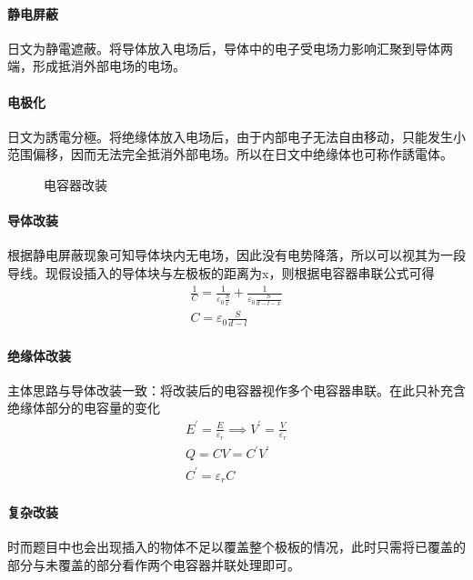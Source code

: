 \paragraph{静电屏蔽}日文为静電遮蔽。将导体放入电场后，导体中的电子受电场力影响汇聚到导体两端，形成抵消外部电场的电场。

\paragraph{电极化}日文为誘電分極。将绝缘体放入电场后，由于内部电子无法自由移动，只能发生小范围偏移，因而无法完全抵消外部电场。所以在日文中绝缘体也可称作誘電体。

\begin{figure}[ht!]
    \centering
    \caption{电容器改装}
\end{figure}

\paragraph{导体改装}根据静电屏蔽现象可知导体块内无电场，因此没有电势降落，所以可以视其为一段导线。现假设插入的导体块与左极板的距离为x，则根据电容器串联公式可得
\begin{gather*}
    \frac{1}{C}=\frac{1}{\varepsilon_0\frac{S}{x}}+\frac{1}{\varepsilon_0\frac{S}{d-l-x}}\\
    C=\varepsilon_0\frac{S}{d-l}
\end{gather*}

\paragraph{绝缘体改装}主体思路与导体改装一致：将改装后的电容器视作多个电容器串联。在此只补充含绝缘体部分的电容量的变化
\begin{gather*}
    E^\prime=\frac{E}{\varepsilon_r}\implies
    V^\prime=\frac{V}{\varepsilon_r}\\
    Q=CV=C^\prime V^\prime\\
    C^\prime=\varepsilon_rC
\end{gather*}

\paragraph{复杂改装}时而题目中也会出现插入的物体不足以覆盖整个极板的情况，此时只需将已覆盖的部分与未覆盖的部分看作两个电容器并联处理即可。

